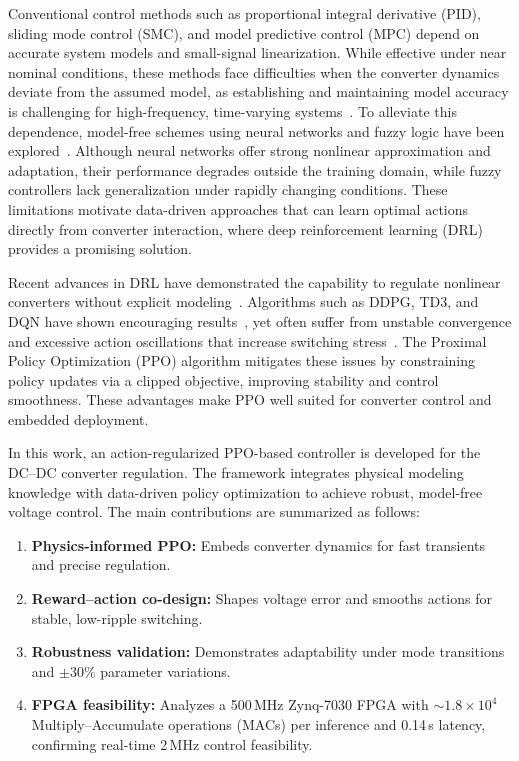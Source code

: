 \documentclass[conference]{IEEEtran}
\begin{document}
Conventional control methods such as proportional integral derivative (PID), sliding mode control (SMC), and model predictive control (MPC) depend on accurate system models and small-signal linearization. While effective under near nominal conditions, these methods face difficulties when the converter dynamics deviate from the assumed model, as establishing and maintaining model accuracy is challenging for high-frequency, time-varying systems~\cite{cui2021voltage}. To alleviate this dependence, model-free schemes using neural networks and fuzzy logic have been explored~\cite{zhao2020overview,benachour2024generalized}. Although neural networks offer strong nonlinear approximation and adaptation, their performance degrades outside the training domain, while fuzzy controllers lack generalization under rapidly changing conditions. These limitations motivate data-driven approaches that can learn optimal actions directly from converter interaction, where deep reinforcement learning (DRL) provides a promising solution.


Recent advances in DRL have demonstrated the capability to regulate nonlinear converters without explicit modeling~\cite{gheisarnejad2020iot,feng2024deep}. Algorithms such as DDPG, TD3, and DQN have shown encouraging results~\cite{tang2021artificial,ye2024td3,muktiadji2024twin,kishore2022performance}, yet often suffer from unstable convergence and excessive action oscillations that increase switching stress~\cite{min2022voltage,ye2024deep}. The Proximal Policy Optimization (PPO) algorithm mitigates these issues by constraining policy updates via a clipped objective, improving stability and control smoothness. These advantages make PPO well suited for converter control and embedded deployment.

In this work, an action-regularized PPO-based controller is developed for the DC--DC converter regulation. The framework integrates physical modeling knowledge with data-driven policy optimization to achieve robust, model-free voltage control. The main contributions are summarized as follows: 
\begin{enumerate}[leftmargin=6pt, itemsep=0pt, topsep=0pt]
    \item \textbf{Physics-informed PPO:} Embeds converter dynamics for fast transients and precise regulation.  
    \item \textbf{Reward–action co-design:} Shapes voltage error and smooths actions for stable, low-ripple switching.  
    \item \textbf{Robustness validation:} Demonstrates adaptability under mode transitions and $\pm30\%$ parameter variations.  
    \item \textbf{FPGA feasibility:} Analyzes a 500\,MHz Zynq-7030 FPGA with $\sim1.8\times10^{4}$ Multiply–Accumulate operations (MACs) per inference and 0.14\,\textmu s latency, confirming real-time 2\,MHz control feasibility.
\end{enumerate}
\end{document}
